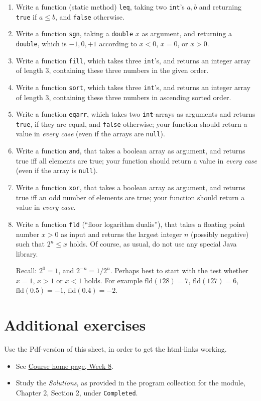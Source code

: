 \documentclass[11pt]{article}
\begin{document}
\begin{enumerate}
\item Write a function (static method) \texttt{leq}, taking two \texttt{int}'s $a, b$ and returning \texttt{true} if $a \le b$, and \texttt{false} otherwise.
\item Write a function \texttt{sgn}, taking a \texttt{double} $x$ as argument, and returning a \texttt{double}, which is $-1, 0 , +1$ according to $x < 0$, $x = 0$, or $x > 0$.
\item Write a function \texttt{fill}, which takes three \texttt{int}'s, and returns an integer array of length $3$, containing these three numbers in the given order.
\item Write a function \texttt{sort}, which takes three \texttt{int}'s, and returns an integer array of length $3$, containing these three numbers in ascending sorted order.
\item Write a function \texttt{eqarr}, which takes two \texttt{int}-arrays as arguments and returns \texttt{true}, if they are equal, and \texttt{false} otherwise; your function should return a value in \emph{every case} (even if the arrays are \texttt{null}).
\item Write a function \texttt{and}, that takes a boolean array as argument, and returns true iff all elements are true; your function should return a value in \emph{every case} (even if the array is \texttt{null}).
\item Write a function \texttt{xor}, that takes a boolean array as argument, and returns true iff an odd number of elements are true; your function should return a value in \emph{every case}.
\item Write a function \texttt{fld} (``floor logarithm dualis''), that takes a floating point number $x > 0$ as input and returns the largest integer $n$ (possibly negative) such that $2^n \le x$ holds. Of course, as usual, do not use any special Java library.

  Recall: $2^0 = 1$, and $2^{-n} = 1 / 2^n$. Perhaps best to start with the test whether $x = 1$, $x > 1$ or $x < 1$ holds. For example $\mathrm{fld}(128) = 7$, $\mathrm{fld}(127) = 6$, $\mathrm{fld}(0.5) = -1$, $\mathrm{fld}(0.4) = -2$.
\end{enumerate}


\section{Additional exercises}
\label{sec:addex}

Use the Pdf-version of this sheet, in order to get the html-links working.
\begin{itemize}
\item See \href{\chp#ExercisesWeek08}{Course home page, Week 8}.
\item Study the \emph{Solutions}, as provided in the program collection for the module, Chapter 2, Section 2, under \texttt{Completed}.
\end{itemize}
\end{document}
